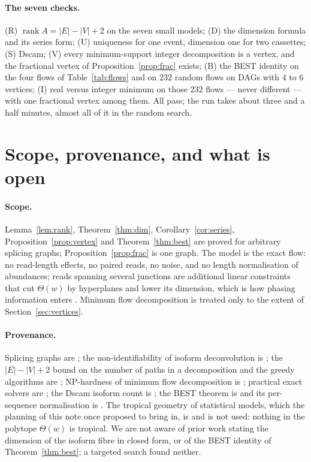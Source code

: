 \documentclass[11pt]{article}
\theoremstyle{plain}
\theoremstyle{definition}
\theoremstyle{remark}
\newcommand{\rank}{\operatorname{rank}}
\newcommand{\Th}{\Theta}
\begin{document}
\paragraph{The seven checks.} (R) $\rank A=|E|-|V|+2$ on the seven small models; (D) the
dimension formula and its series form; (U) uniqueness for one event, dimension one for two
cassettes; (S) Dscam; (V) every minimum-support integer decomposition is a vertex, and the
fractional vertex of Proposition~\ref{prop:frac} exists; (B) the BEST identity on the four
flows of Table~\ref{tab:flows} and on $232$ random flows on DAGs with $4$ to $6$ vertices;
(I) real versus integer minimum on those $232$ flows --- never different --- with one
fractional vertex among them. All pass; the run takes about three and a half minutes, almost
all of it in the random search.

\section{Scope, provenance, and what is open}

\paragraph{Scope.} Lemma~\ref{lem:rank}, Theorem~\ref{thm:dim},
Corollary~\ref{cor:series}, Proposition~\ref{prop:vertex} and Theorem~\ref{thm:best} are
proved for arbitrary splicing graphs; Proposition~\ref{prop:frac} is one graph. The model is
the exact flow: no read-length effects, no paired reads, no noise, and no length
normalisation of abundances; reads spanning several junctions are additional linear
constraints that cut $\Th(w)$ by hyperplanes and lower its dimension, which is how phasing
information enters \cite{HJXW09}. Minimum flow decomposition is treated only to the extent
of Section~\ref{sec:vertices}.

\paragraph{Provenance.} Splicing graphs are \cite{HAST02}; the non-identifiability of
isoform deconvolution is \cite{LSGB08,HJXW09}; the $|E|-|V|+2$ bound on the number of paths
in a decomposition and the greedy algorithms are \cite{VCCM08}; NP-hardness of minimum flow
decomposition is \cite{HHKS12}; practical exact solvers are \cite{KKO18,DT22}; the Dscam
isoform count is \cite{SCH00}; the BEST theorem is \cite{AEdB,SmithTutte} and its
per-sequence normalisation is \cite{Bio8}. The tropical geometry of statistical models,
which the planning of this note once proposed to bring in, is \cite{PS04} and is not used:
nothing in the polytope $\Th(w)$ is tropical. We are not aware of prior work stating the
dimension of the isoform fibre in closed form, or of the BEST identity of
Theorem~\ref{thm:best}; a targeted search found neither.
\end{document}
